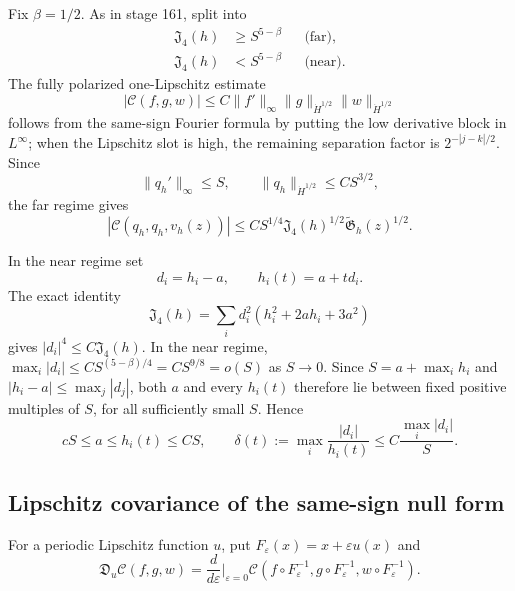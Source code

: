 \documentclass[11pt]{amsart}
\numberwithin{equation}{section}
\theoremstyle{definition}
\theoremstyle{remark}
\newcommand{\Jfour}{\mathfrak J_4}
\newcommand{\Gtilde}{\widetilde{\mathfrak G}}
\newcommand{\Cnull}{\mathcal C}
\begin{document}
Fix $\beta=1/2$.  As in stage 161, split into
\begin{align}
 \Jfour(h)&\ge S^{5-\beta}&&\text{(far)},\label{PT:eq:far-regime}\\
 \Jfour(h)&<S^{5-\beta}&&\text{(near)}.\label{PT:eq:near-regime}
\end{align}
The fully polarized one-Lipschitz estimate
\begin{equation}\label{PT:eq:one-slot}
 |\Cnull(f,g,w)|
 \le C\|f'\|_\infty
       \|g\|_{\dot H^{1/2}}\|w\|_{\dot H^{1/2}}
\end{equation}
follows from the same-sign Fourier formula by putting the low derivative
block in $L^\infty$; when the Lipschitz slot is high, the remaining
separation factor is $2^{-|j-k|/2}$.  Since
\begin{equation}\label{PT:eq:q-size}
 \|q_h'\|_\infty\le S,
 \qquad \|q_h\|_{\dot H^{1/2}}\le CS^{3/2},
\end{equation}
the far regime gives
\begin{equation}\label{PT:eq:far-bound}
 |\Cnull(q_h,q_h,v_h(z))|
 \le CS^{1/4}\Jfour(h)^{1/2}\Gtilde_h(z)^{1/2}.
\end{equation}

In the near regime set
\begin{equation}\label{PT:eq:path}
 d_i=h_i-a,\qquad h_i(t)=a+td_i.
\end{equation}
The exact identity
\begin{equation}\label{PT:eq:Jidentity}
 \Jfour(h)=\sum_i d_i^2(h_i^2+2ah_i+3a^2)
\end{equation}
gives $|d_i|^4\le C\Jfour(h)$.  In the near regime,
$\max_i|d_i|\le CS^{(5-\beta)/4}=CS^{9/8}=o(S)$ as $S\to0$.
Since $S=a+\max_i h_i$ and $|h_i-a|\le\max_j|d_j|$, both $a$ and every
$h_i(t)$ therefore lie between fixed positive multiples of $S$, for all
sufficiently small $S$.  Hence
\begin{equation}\label{PT:eq:comparable}
 cS\le a\le h_i(t)\le CS,
 \qquad
 \delta(t):=\max_i\frac{|d_i|}{h_i(t)}
 \le C\frac{\max_i|d_i|}{S}.
\end{equation}

\subsection{Lipschitz covariance of the same-sign null form}

For a periodic Lipschitz function $u$, put
$F_\varepsilon(x)=x+\varepsilon u(x)$ and
\begin{equation}\label{PT:eq:transport-derivative}
 \mathfrak D_u\Cnull(f,g,w)
 =\frac d{d\varepsilon}\bigg|_{\varepsilon=0}
 \Cnull(f\circ F_\varepsilon^{-1},
        g\circ F_\varepsilon^{-1},
        w\circ F_\varepsilon^{-1}).
\end{equation}
\end{document}

